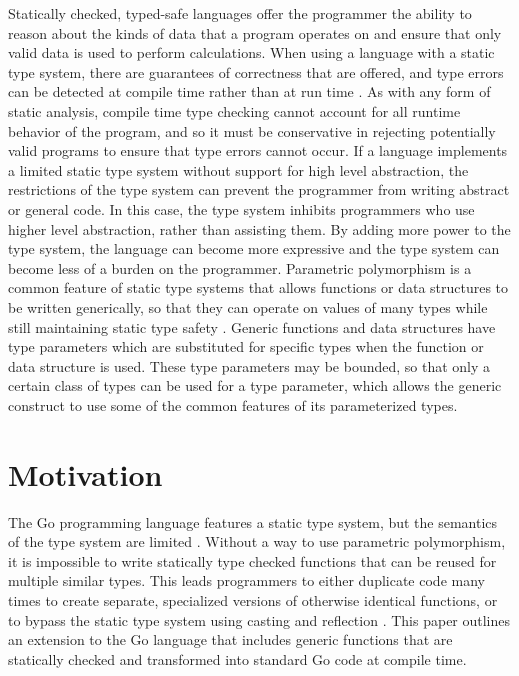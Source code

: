 \documentclass[letterpaper,11pt]{article}
\begin{document}
Statically checked, typed-safe languages offer the programmer the ability to reason about the kinds of data that a program operates on and ensure that only valid data is used to perform calculations. When using a language with a static type system, there are guarantees of correctness that are offered, and type errors can be detected at compile time rather than at run time \cite{milner1978theory}. As with any form of static analysis, compile time type checking cannot account for all runtime behavior of the program, and so it must be conservative in rejecting potentially valid programs to ensure that type errors cannot occur. If a language implements a limited static type system without support for high level abstraction, the restrictions of the type system can prevent the programmer from writing abstract or general code. In this case, the type system inhibits programmers who use higher level abstraction, rather than assisting them. By adding more power to the type system, the language can become more expressive and the type system can become less of a burden on the programmer. Parametric polymorphism is a common feature of static type systems that allows functions or data structures to be written generically, so that they can operate on values of many types while still maintaining static type safety \cite{cardelli1987basic}. Generic functions and data structures have type parameters which are substituted for specific types when the function or data structure is used. These type parameters may be bounded, so that only a certain class of types can be used for a type parameter, which allows the generic construct to use some of the common features of its parameterized types.

\section{Motivation} \label{motivation}

The Go programming language features a static type system, but the semantics of the type system are limited \cite{gospec}. Without a way to use parametric polymorphism, it is impossible to write statically type checked functions that can be reused for multiple similar types. This leads programmers to either duplicate code many times to create separate, specialized versions of otherwise identical functions, or to bypass the static type system using casting and reflection \cite{gofaq}.  This paper outlines an extension to the Go language that includes generic functions that are statically checked and transformed into standard Go code at compile time.
\end{document}
